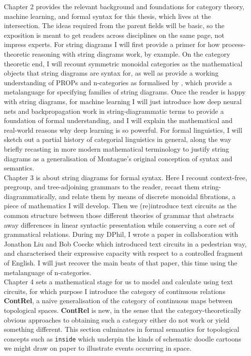 Chapter 2 provides the relevant background and foundations for category theory, machine learning, and formal syntax for this thesis, which lives at the intersection. The ideas required from the parent fields will be basic, so the exposition is meant to get readers across disciplines on the same page, not impress experts. For string diagrams I will first provide a primer for how process-theoretic reasoning with string diagrams work, by example. On the category theoretic end, I will recount symmetric monoidal categories as the mathematical objects that string diagrams are syntax for, as well as provide a working understanding of PROPs \citep{} and n-categories as formalised by \citep{}, which provide a metalanguage for specifying families of string diagrams. Once the reader is happy with string diagrams, for machine learning I will just introduce how deep neural nets and backpropagation work in string-diagrammatic terms to provide a foundation of formal understanding, and I will explain the mathematical and real-world reasons why deep learning is so powerful. For formal linguistics, I will sketch out a partial history of categorial linguistics in general, along the way briefly recasting \citep{} in more modern mathematical terminology to justify string diagrams as a generalisation of Montague's original conception of syntax and semantics.\\

Chapter 3 is about string diagrams for formal syntax. Here I recount context-free, pregroup, and tree-adjoining grammars to the reader, recast them string-diagrammatically, and relate them by means of discrete monoidal fibrations, a piece of mathematics I will develop. Then we (re)introduce text circuits as the common structure between those different theories of grammar that abstracts away differences in linear syntactic presentation while conserving a core set of grammatical relations. During my DPhil, I wrote a paper \citep{} in collaboration with Jonathon Liu and Bob Coecke which introduced text circuits in a pedestrian way, and characterised their expressive capacity with respect to a controlled fragment of English. I will just recover the main beats of that paper, this time using the metalanguage of n-categories.\\

Chapter 4 sets a mathematical stage for us to model and calculate using text circuits, for which purpose I introduce the category of continuous relations \textbf{ContRel}, a na\"{i}ve generalisation of the category of continuous maps between topological spaces. \textbf{ContRel} is new, in the sense that the category-theoretically obvious approaches to obtaining such a category either do not work or yield something different. This section culminates in formal semantics for topological concepts such as \texttt{inside} which underpin the kinds of schematic doodle cartoons we might draw on paper to illustrate events occurring in space.\\

